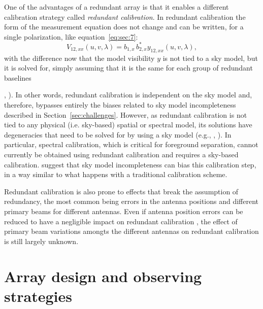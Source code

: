 One of the advantages of a redundant array is that it enables a different calibration strategy called {\it redundant calibration}. In redundant calibration the form of the measurement equation does not change and can be written, for a single polarization, like equation~\ref{eq:sec:7}:
\begin{equation}
V_{12,xx} (u,v,\lambda) = b_{1,x} \, b_{2,x}^* y_{12,xx} (u,v,\lambda),
\label{eq:sec:9}
\end{equation}
with the difference now that the model visibility $y$ is not tied to a sky model, but it is solved for, simply assuming that it is the same for each group of redundant baselines {\cite{wieringa92}, \cite{liu10}). In other words, redundant calibration is independent on the sky model and, therefore, bypasses entirely the biases related to sky model incompleteness described in Section~\ref{sec:challenges}. However, as redundant calibration is not tied to any physical (i.e. sky-based) spatial or spectral model, its solutions have degeneracies that need to be solved for by using a sky model (e.g., \cite{zheng14}, \cite{byrne19}). In particular, spectral calibration, which is critical for foreground separation, cannot currently be obtained using redundant calibration and requires a sky-based calibration. \cite{byrne19} suggest that sky model incompleteness can bias this calibration step, in a way similar to what happens with a traditional calibration scheme.

Redundant calibration is also prone to effects that break the assumption of redundancy, the most common being errors in the antenna positions and different primary beams for different antennas. Even if antenna position errors can be reduced to have a negligible impact on redundant calibration \cite{joseph19}, the effect of primary beam variations amongts the different antennas on redundant calibration is still largely unknown.


\section{Array design and observing strategies}
\label{sec:design}

}
